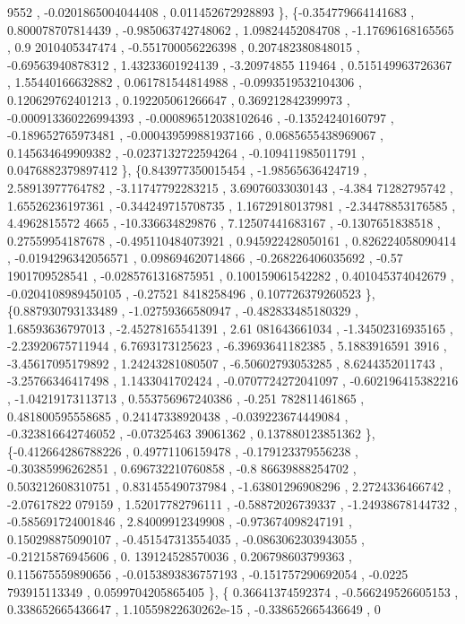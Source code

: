 \begin{DoxyCode}
      9552 , -0.0201865004044408 , 0.011452672928893 \},
\{-0.354779664141683 , 0.800078707814439 , -0.985063742748062 ,  1.09824452084708 , -1.17696168165565 ,  0.9
      2010405347474 , -0.551700056226398 , 0.207482380848015 , -0.69563940878312 ,  1.43233601924139 , -3.20974855
      119464 , 0.515149963726367 ,  1.55440166632882 , 0.061781544814988 , -0.0993519532104306 , 0.120629762401213
       , 0.192205061266647 , 0.369212842399973 , -0.000913360226994393 , -0.000896512038102646 , -0.13524240160797
       , -0.189652765973481 , -0.000439599881937166 , 0.0685655438969067 , 0.145634649909382 , -0.0237132722594264
       , -0.109411985011791 , 0.0476882379897412 \},
\{0.843977350015454 , -1.98565636424719 ,  2.58913977764782 , -3.11747792283215 ,  3.69076033030143 , -4.384
      71282795742 ,  1.65526236197361 , -0.344249715708735 ,  1.16729180137981 , -2.34478853176585 ,  4.4962815572
      4665 ,  -10.336634829876 ,  7.12507441683167 ,  -0.1307651838518 ,  0.27559954187678 , -0.495110484073921 , 
      0.945922428050161 , 0.826224058090414 , -0.0194296342056571 , 0.098694620714866 , -0.268226406035692 , -0.57
      1901709528541 , -0.0285761316875951 , 0.100159061542282 , 0.401045374042679 , -0.0204108989450105 , -0.27521
      8418258496 , 0.107726379260523 \},
\{0.887930793133489 , -1.02759366580947 , -0.482833485180329 ,  1.68593636797013 , -2.45278165541391 ,  2.61
      081643661034 , -1.34502316935165 , -2.23920675711944 ,   6.7693173125623 , -6.39693641182385 ,  5.1883916591
      3916 , -3.45617095179892 ,  1.24243281080507 , -6.50602793053285 ,   8.6244352011743 , -3.25766346417498 ,  
       1.1433041702424 , -0.0707724272041097 , -0.602196415382216 , -1.04219173113713 , 0.553756967240386 , -0.251
      782811461865 , 0.481800595558685 ,  0.24147338920438 , -0.039223674449084 , -0.323816642746052 , -0.07325463
      39061362 , 0.137880123851362 \},
\{-0.412664286788226 ,  0.49771106159478 , -0.179123379556238 , -0.30385996262851 , 0.696732210760858 , -0.8
      86639888254702 , 0.503212608310751 , 0.831455490737984 , -1.63801296908296 ,   2.2724336466742 , -2.07617822
      079159 ,  1.52017782796111 , -0.58872026739337 , -1.24938678144732 , -0.585691724001846 ,  2.84009912349908 
      , -0.973674098247191 , 0.150298875090107 , -0.451547313554035 , -0.0863062303943055 , -0.21215876945606 , 0.
      139124528570036 , 0.206798603799363 , 0.115675559890656 , -0.0153893836757193 , -0.151757290692054 , -0.0225
      793915113349 , 0.0599704205865405 \},
\{ 0.36641374592374 , -0.566249526605153 , 0.338652665436647 , 1.10559822630262e-15 , -0.338652665436649 , 0

\end{DoxyCode}
